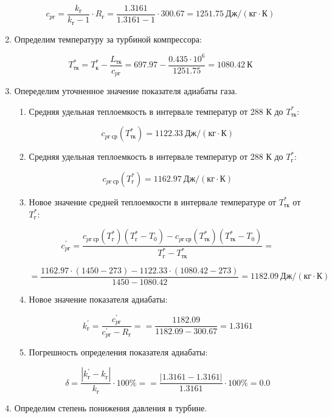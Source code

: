 \documentclass[a4paper,10pt]{article}
\begin{document}
\begin{enumerate}
	\[
	c_{pг} = \frac{ k_г }{ k_г - 1 } \cdot R_г = 
			\frac{ 1.3161 }{ 1.3161 - 1 } \cdot 300.67 = 
			1251.75\ Дж / (кг \cdot К)
	\]
	
	\item Определим температуру за турбиной компрессора:
	
	\[
	T_{тк}^* = T_к^* - \frac{ L_{тк} }{ c_{pг} } = 
			697.97 - \frac{ 0.435 \cdot 10^6  }{ 1251.75 } = 
			1080.42\ К
	\]
	
	\item Опеределим уточненное значение показателя адиабаты газа.
	
	\begin{enumerate}
	
		\item Средняя удельная теплоемкость в интервале температур от 288 К до $ T_{тк}^* $:
		
		\[
		c_{pг\ ср} (T_{тк}^*) = 1122.33\ Дж / (кг \cdot К)
		\]
		
		\item Средняя удельная теплоемкость в интервале температур от 288 К до $ T_{г}^* $:
		
		\[
		c_{pг\ ср} (T_{г}^*) = 1162.97\ Дж / (кг \cdot К)
		\]
		
		\item Новое значение средней теплоемкости в интервале температуре от $ T_{тк}^* $ от $ T_{г}^* $:
		
		\[c_{pг}^\prime = \frac{
		c_{pг\ ср}(T_г^*) (T_г^* - T_0) - c_{pг\ ср}(T_{тк}^*) (T_{тк}^* - T_0)
		}{
		T_г^* - T_{тк}^*} = \]
		
		\[ =\frac{
		1162.97 \cdot (1450 - 273) - 
		1122.33 \cdot (1080.42 - 273)
		}{
		1450 - 1080.42} = 
		1182.09 \ Дж / (кг \cdot К)
		\]
		
		\item Новое значение показателя адиабаты:
		
		\[
		k_{г}^\prime = \frac{ c_{pг}^\prime }{ c_{pг}^\prime - R_г } = 
				= \frac{ 1182.09 }{ 1182.09 - 300.67 } =
				1.3161
		\]
		
		\item Погрешность определения показателя адиабаты:
		
		\[
		\delta = \frac{ \left| k_{г}^\prime - k_{г} \right| }{ k_{г} } \cdot 100 \% =
				= \frac{ \left| 1.3161 - 1.3161 \right| }{ 1.3161 } \cdot 100 \%
				= 0.0
		\]
	
	\end{enumerate}
	
	\item Определим степень понижения давления в турбине.
	

\end{enumerate}
\end{document}
